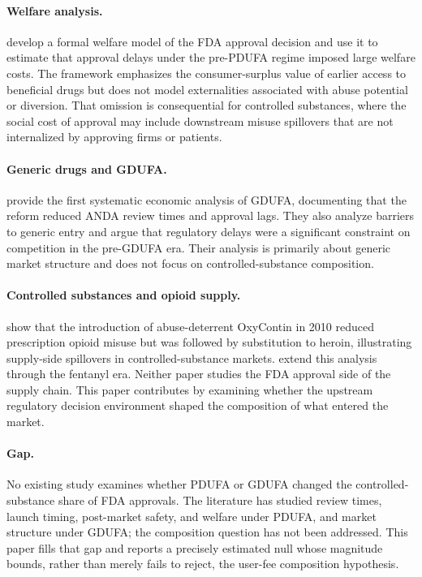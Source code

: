 \paragraph{Welfare analysis.}
\textcite{philipsonCostbenefitAnalysisFDA2008} develop a formal welfare model of the FDA approval decision and use it to estimate that approval delays under the pre-PDUFA regime imposed large welfare costs. The framework emphasizes the consumer-surplus value of earlier access to beneficial drugs but does not model externalities associated with abuse potential or diversion. That omission is consequential for controlled substances, where the social cost of approval may include downstream misuse spillovers that are not internalized by approving firms or patients.

\paragraph{Generic drugs and GDUFA.}
\textcite{berndtGenericDrugUser2018} provide the first systematic economic analysis of GDUFA, documenting that the reform reduced ANDA review times and approval lags. They also analyze barriers to generic entry and argue that regulatory delays were a significant constraint on competition in the pre-GDUFA era. Their analysis is primarily about generic market structure and does not focus on controlled-substance composition.

\paragraph{Controlled substances and opioid supply.}
\textcite{alpertSupplySideDrugPolicy2018a} show that the introduction of abuse-deterrent OxyContin in 2010 reduced prescription opioid misuse but was followed by substitution to heroin, illustrating supply-side spillovers in controlled-substance markets. \textcite{powellEVOLVINGCONSEQUENCESOXYCONTIN2021} extend this analysis through the fentanyl era. Neither paper studies the FDA approval side of the supply chain. This paper contributes by examining whether the upstream regulatory decision environment shaped the composition of what entered the market.

\paragraph{Gap.}
No existing study examines whether PDUFA or GDUFA changed the controlled-substance share of FDA approvals. The literature has studied review times, launch timing, post-market safety, and welfare under PDUFA, and market structure under GDUFA; the composition question has not been addressed. This paper fills that gap and reports a precisely estimated null whose magnitude bounds, rather than merely fails to reject, the user-fee composition hypothesis.
